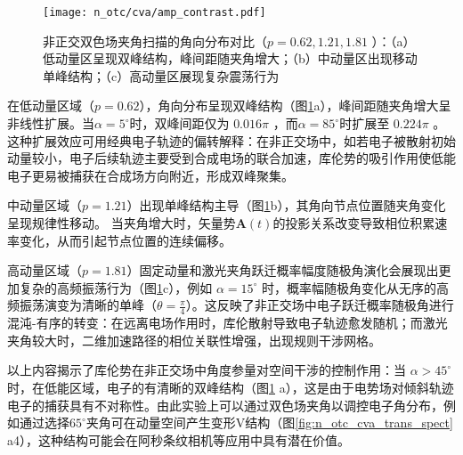 \begin{figure}[!htpb]
	\centering
	\texttt{[image: n\_otc/cva/amp\_contrast.pdf]}
	\caption{非正交双色场夹角扫描的角向分布对比（$p=0.62,1.21,1.81$ ）：（a）低动量区呈现双峰结构，峰间距随夹角增大；（b）中动量区出现移动单峰结构；（c）高动量区展现复杂震荡行为}
	\label{amp_contrast}
\end{figure}

在低动量区域（$p=0.62$），角向分布呈现双峰结构（图\ref{amp_contrast}a），峰间距随夹角增大呈非线性扩展。当$\alpha=5^\circ$时，双峰间距仅为 $0.016\pi$ ，而$\alpha=85^\circ$时扩展至 $0.224 \pi$ 。这种扩展效应可用经典电子轨迹的偏转解释：在非正交场中，如若电子被散射初始动量较小，电子后续轨迹主要受到合成电场的联合加速，库伦势的吸引作用使低能电子更易被捕获在合成场方向附近，形成双峰聚集。

中动量区域（$p=1.21$）出现单峰结构主导（图\ref{amp_contrast}b），其角向节点位置随夹角变化呈现规律性移动。
当夹角增大时，矢量势$\mathbf{A}(t)$的投影关系改变导致相位积累速率变化，从而引起节点位置的连续偏移。

高动量区域（$p=1.81$）固定动量和激光夹角跃迁概率幅度随极角演化会展现出更加复杂的高频振荡行为（图\ref{amp_contrast}c），例如 $\alpha = 15^\circ$ 时，概率幅随极角变化从无序的高频振荡演变为清晰的单峰（$\theta=\frac{\pi}{4}$）。这反映了非正交场中电子跃迁概率随极角进行混沌-有序的转变：在远离电场作用时，库伦散射导致电子轨迹愈发随机；而激光夹角较大时，二维加速路径的相位关联性增强，出现规则干涉网格。

以上内容揭示了库伦势在非正交场中角度参量对空间干涉的控制作用：当 $\alpha>45^\circ$ 时，在低能区域，电子的有清晰的双峰结构（图\ref{amp_contrast} a），这是由于电势场对倾斜轨迹电子的捕获具有不对称性。由此实验上可以通过双色场夹角以调控电子角分布，例如通过选择$65^\circ$夹角可在动量空间产生变形V结构（图\ref{fig:n_otc_cva_trans_spect} a4），这种结构可能会在阿秒条纹相机等应用中具有潜在价值。


